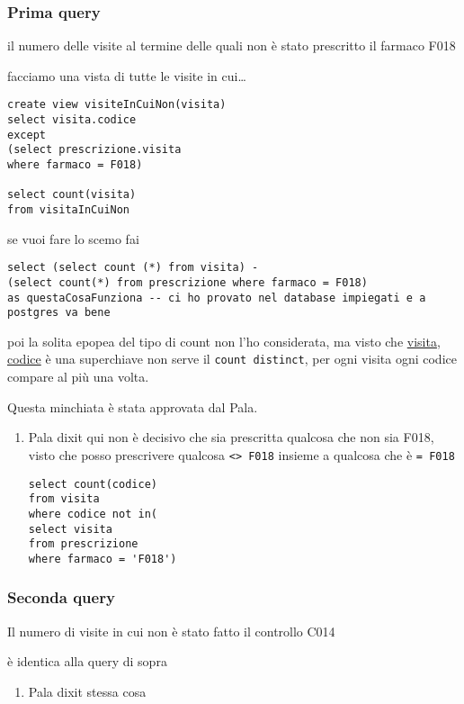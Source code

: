 \documentclass[11pt]{article}
\begin{document}
\subsubsection{Prima query}
\label{sec:org554c2c4}
il numero delle visite al termine delle quali non è stato prescritto il farmaco F018

facciamo una vista di tutte le visite in cui\ldots{}

\begin{verbatim}
create view visiteInCuiNon(visita)
select visita.codice
except
(select prescrizione.visita
where farmaco = F018)

select count(visita)
from visitaInCuiNon
\end{verbatim}

se vuoi fare lo scemo fai

\begin{verbatim}
select (select count (*) from visita) -
(select count(*) from prescrizione where farmaco = F018)
as questaCosaFunziona -- ci ho provato nel database impiegati e a postgres va bene
\end{verbatim}

poi la solita epopea del tipo di count non l'ho considerata, ma visto che \uline{visita},
\uline{codice} è una superchiave non serve il \texttt{count distinct}, per ogni visita ogni codice
compare al più una volta.

Questa minchiata è stata approvata dal Pala.

\begin{enumerate}
\item Pala dixit
\label{sec:org670a259}
qui non è decisivo che sia prescritta qualcosa che non sia F018, visto che posso
prescrivere qualcosa \texttt{<> F018} insieme a qualcosa che è \texttt{= F018}
\begin{verbatim}
select count(codice)
from visita
where codice not in(
select visita
from prescrizione
where farmaco = 'F018')
\end{verbatim}
\end{enumerate}

\subsubsection{Seconda query}
\label{sec:orge80ba2b}
Il numero di visite in cui non è stato fatto il controllo C014

è identica alla query di sopra

\begin{enumerate}
\item Pala dixit
\label{sec:org0bb5c09}
stessa cosa
\end{enumerate}
\end{document}
